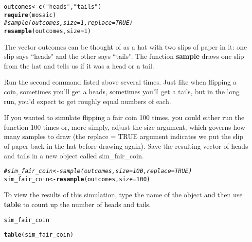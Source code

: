 \documentclass{article}\usepackage[]{graphicx}\usepackage[]{color}
\makeatletter
\newcommand{\hlnum}[1]{\textcolor[rgb]{0.686,0.059,0.569}{#1}}%
\newcommand{\hlstr}[1]{\textcolor[rgb]{0.192,0.494,0.8}{#1}}%
\newcommand{\hlcom}[1]{\textcolor[rgb]{0.678,0.584,0.686}{\textit{#1}}}%
\newcommand{\hlstd}[1]{\textcolor[rgb]{0.345,0.345,0.345}{#1}}%
\newcommand{\hlkwb}[1]{\textcolor[rgb]{0.69,0.353,0.396}{#1}}%
\newcommand{\hlkwc}[1]{\textcolor[rgb]{0.333,0.667,0.333}{#1}}%
\newcommand{\hlkwd}[1]{\textcolor[rgb]{0.737,0.353,0.396}{\textbf{#1}}}%
\newenvironment{kframe}{%
 \def\at@end@of@kframe{}%
 \ifinner\ifhmode%
  \def\at@end@of@kframe{\end{minipage}}%
  \begin{minipage}{\columnwidth}%
 \fi\fi%
 \def\FrameCommand##1{\hskip\@totalleftmargin \hskip-\fboxsep
 \colorbox{shadecolor}{##1}\hskip-\fboxsep
     \hskip-\linewidth \hskip-\@totalleftmargin \hskip\columnwidth}%
 \MakeFramed {\advance\hsize-\width
   \@totalleftmargin\z@ \linewidth\hsize
   \@setminipage}}%
 {\par\unskip\endMakeFramed%
 \at@end@of@kframe}
\newenvironment{knitrout}{}{} %
\makeatother
\begin{document}
\begin{knitrout}
\color{fgcolor}\begin{kframe}
\begin{alltt}
\hlstd{outcomes} \hlkwb{<-} \hlkwd{c}\hlstd{(}\hlstr{"heads"}\hlstd{,} \hlstr{"tails"}\hlstd{)}
\hlkwd{require}\hlstd{(mosaic)}
\hlcom{# sample(outcomes, size = 1, replace = TRUE)}
\hlkwd{resample}\hlstd{(outcomes,} \hlkwc{size} \hlstd{=} \hlnum{1}\hlstd{)}
\end{alltt}
\end{kframe}
\end{knitrout}


The vector \hlstd{outcomes} can be thought of as a hat with two slips of paper in it: one slip says ``heads" and the other says ``tails". The function \hlkwd{sample} draws one slip from the hat and tells us if it was a head or a tail. 

Run the second command listed above several times. Just like when flipping a coin, sometimes you'll get a heads, sometimes you'll get a tails, but in the long run, you'd expect to get roughly equal numbers of each.

If you wanted to simulate flipping a fair coin 100 times, you could either run the function 100 times or, more simply, adjust the \hlkwc{size} argument, which governs how many samples to draw (the \hlkwc{replace = }\hlnum{TRUE} argument indicates we put the slip of paper back in the hat before drawing again). Save the resulting vector of heads and tails in a new object called \hlstd{sim\_fair\_coin}.

\begin{knitrout}
\color{fgcolor}\begin{kframe}
\begin{alltt}
\hlcom{# sim_fair_coin <- sample(outcomes, size = 100, replace = TRUE)}
\hlstd{sim_fair_coin} \hlkwb{<-} \hlkwd{resample}\hlstd{(outcomes,} \hlkwc{size} \hlstd{=} \hlnum{100}\hlstd{)}
\end{alltt}
\end{kframe}
\end{knitrout}


To view the results of this simulation, type the name of the object and then use \hlkwd{table} to count up the number of heads and tails.

\begin{knitrout}
\color{fgcolor}\begin{kframe}
\begin{alltt}
\hlstd{sim_fair_coin}

\hlkwd{table}\hlstd{(sim_fair_coin)}
\end{alltt}
\end{kframe}
\end{knitrout}
\end{document}
